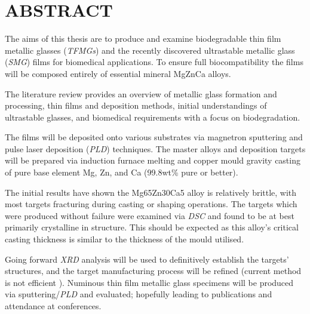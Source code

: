 \section{ABSTRACT}
 
The aims of this thesis are to produce and examine biodegradable thin film metallic glasses (\textit{TFMGs}) and the recently discovered ultrastable metallic glass (\textit{SMG}) films for biomedical applications. To ensure full biocompatibility the films will be composed entirely of essential mineral MgZnCa alloys.

The literature review provides an overview of metallic glass formation and processing, thin films and deposition methods, initial understandings of ultrastable glasses, and biomedical requirements with a focus on biodegradation. 

The films will be deposited onto various substrates via magnetron sputtering and pulse laser deposition (\textit{PLD}) techniques. The master alloys and deposition targets will be prepared via induction furnace melting and copper mould gravity casting of pure base element Mg, Zn, and Ca (99.8wt\% pure or better).

The initial results have shown the Mg65Zn30Ca5 alloy is relatively brittle, with most targets fracturing during casting or shaping operations. The targets which were produced without failure were examined via \textit{DSC} and found to be at best primarily crystalline in structure. This should be expected as this alloy’s critical casting thickness is similar to the thickness of the mould utilised. 

Going forward \textit{XRD} analysis will be used to definitively establish the targets’ structures, and the target manufacturing process will be refined (current method is not efficient ). Numinous thin film metallic glass specimens will be produced via sputtering/\textit{PLD} and evaluated; hopefully leading to publications and attendance at conferences. 